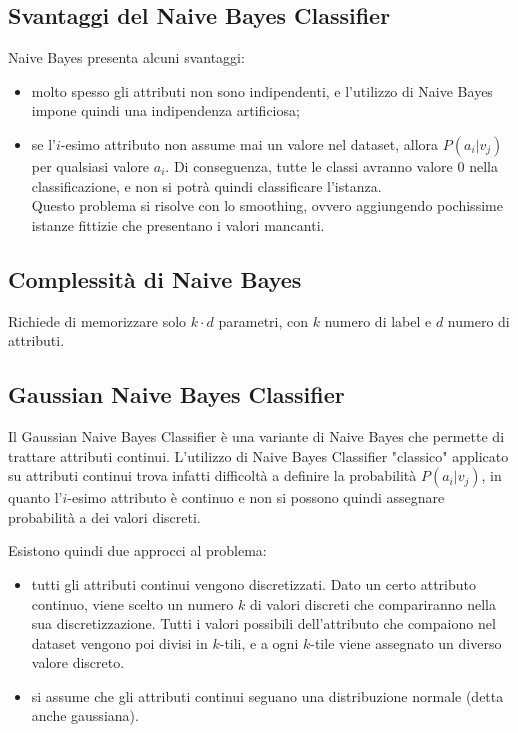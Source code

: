 \subsection{Svantaggi del Naive Bayes Classifier}
Naive Bayes presenta alcuni svantaggi:
\begin{itemize}
    \item molto spesso gli attributi non sono indipendenti, e l'utilizzo di
    Naive Bayes impone quindi una indipendenza artificiosa;
    \item se l'$i$-esimo attributo non assume mai un valore nel dataset, allora
    $P(a_i | v_j)$ per qualsiasi valore $a_i$. Di conseguenza, tutte le classi
    avranno valore $0$ nella classificazione, e non si potrà quindi classificare
    l'istanza.\\
    Questo problema si risolve con lo smoothing, ovvero aggiungendo pochissime
    istanze fittizie che presentano i valori mancanti.
\end{itemize}

\subsection{Complessità di Naive Bayes}
Richiede di memorizzare solo $k \cdot d$ parametri, con $k$ numero di label e
$d$ numero di attributi.

\subsection{Gaussian Naive Bayes Classifier}
Il Gaussian Naive Bayes Classifier è una variante di Naive Bayes che permette
di trattare attributi continui.
L'utilizzo di Naive Bayes Classifier "classico" applicato su attributi continui
trova infatti difficoltà a definire la probabilità $P(a_i | v_j)$, in quanto
l'$i$-esimo attributo è continuo e non si possono quindi assegnare probabilità
a dei valori discreti.

Esistono quindi due approcci al problema:
\begin{itemize}
    \item tutti gli attributi continui vengono discretizzati. Dato un certo
    attributo continuo, viene scelto un numero $k$ di valori discreti che
    compariranno nella sua discretizzazione. Tutti i valori possibili
    dell'attributo che compaiono nel dataset vengono poi divisi in $k$-tili,
    e a ogni $k$-tile viene assegnato un diverso valore discreto.
    \item si assume che gli attributi continui seguano una distribuzione
    normale (detta anche gaussiana).
\end{itemize}

